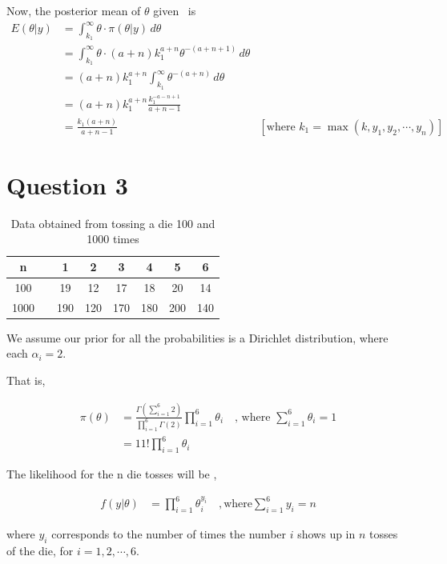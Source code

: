 \documentclass[a4paper]{article}
\begin{document}
Now, the posterior mean of \(\theta\) given \ is 
\begin{align*}
    E(\theta|y) &= \int_{k_1}^{\infty} \theta \cdot \pi(\theta|y) \,d\theta \\
    &= \int_{k_1}^{\infty} \theta \cdot (a+n) k_1^{a+n} \theta^{-(a+n+1)}\,d\theta \\
    &= (a+n)k_1^{a+n} \int_{k_1}^{\infty} \theta^{-(a+n)}\, d\theta\\
    &= (a+n)k_1^{a+n} \frac{k_1^{-a-n+1}}{a+n-1} \\
    &= \frac{k_1(a+n)}{a+n-1} & [\text{where \(k_1 = \max(k,y_1,y_2,\cdots,y_n)\)}]
\end{align*}


\newpage

\section*{Question 3}

\begin{table}[ht]
    \centering
    \begin{tabular}{@{}cccccccc@{}}
        \toprule
        n & &1 & 2 & 3 & 4 & 5 & 6\\
        \midrule
        100 & &19 & 12 & 17 & 18 & 20 & 14\\
        1000 & &190 & 120 & 170 & 180 & 200 & 140\\
        \bottomrule
    \end{tabular}
    \caption{Data obtained from tossing a die 100 and 1000 times}
\end{table}

We assume our prior for all the probabilities is a Dirichlet distribution, where each \(\alpha_i = 2\). 

That is,

\begin{align*}
    \pi(\theta) &= \frac{\Gamma(\sum_{i=1}^{6} 2)}{\prod_{i=1}^{6} \Gamma(2)} \prod_{i=1}^{6} \theta_i \quad \text{, where \(\sum_{i=1}^{6} \theta_i = 1\)} \\
    &= 11! \prod_{i=1}^{6} \theta_i
\end{align*}

The likelihood for the n die tosses will be ,

\begin{align*}
    f(y|\theta) &= \prod_{i=1}^{6} \theta_i^{y_i} \quad ,\text{where} \sum_{i=1}^{6} y_i = n
\end{align*}

where \(y_i\) corresponds to the number of times the number \(i\) shows up in \(n\) tosses of the die, for \(i = 1,2, \cdots, 6\).
\end{document}
